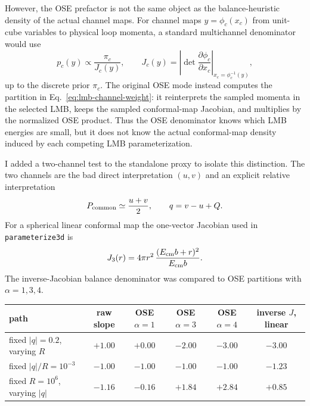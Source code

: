 \documentclass[11pt]{article}
\begin{document}
However, the OSE prefactor is not the same object as the balance-heuristic
density of the actual channel maps.  For channel maps
$y=\phi_c(x_c)$ from unit-cube variables to physical loop momenta, a standard
multichannel denominator would use
\begin{equation}
  p_c(y) \propto \frac{\pi_c}{J_c(y)},
  \qquad
  J_c(y)=\left|\det\frac{\partial\phi_c}{\partial x_c}\right|_{x_c=\phi_c^{-1}(y)} ,
  \label{eq:inverse-jacobian-channel-density}
\end{equation}
up to the discrete prior $\pi_c$.  The original OSE mode instead computes the
partition in Eq.~\eqref{eq:lmb-channel-weight}: it reinterprets the sampled
momenta in the selected LMB, keeps the sampled conformal-map Jacobian, and
multiplies by the normalized OSE product.  Thus the OSE denominator knows
which LMB energies are small, but it does not know the actual conformal-map
density induced by each competing LMB parameterization.

I added a two-channel test to the standalone proxy to isolate this distinction.
The two channels are the bad direct interpretation $(u,v)$ and an explicit
relative interpretation
\[
  P_{\rm common}\simeq \frac{u+v}{2},
  \qquad
  q = v-u+Q.
\]
For a spherical linear conformal map the one-vector Jacobian used in
\texttt{parameterize3d} is
\[
  J_3(r)=4\pi r^2\,\frac{(E_{\rm cm}b+r)^2}{E_{\rm cm}b}.
\]
The inverse-Jacobian balance denominator was compared to OSE partitions with
$\alpha=1,3,4$.

\begin{center}
\small
\begin{tabular}{lccccc}
\toprule
path & raw slope & OSE $\alpha=1$ & OSE $\alpha=3$ & OSE $\alpha=4$ &
inverse $J$, linear\\
\midrule
fixed $|q|=0.2$, varying $R$ & $+1.00$ & $+0.00$ & $-2.00$ & $-3.00$ & $-3.00$\\
fixed $|q|/R=10^{-3}$ & $-1.00$ & $-1.00$ & $-1.00$ & $-1.00$ & $-1.23$\\
fixed $R=10^6$, varying $|q|$ & $-1.16$ & $-0.16$ & $+1.84$ & $+2.84$ & $+0.85$\\
\bottomrule
\end{tabular}
\end{center}
\end{document}
